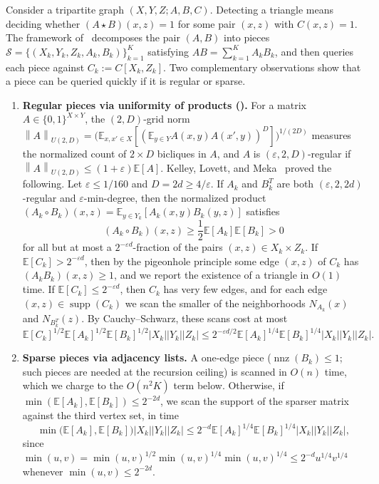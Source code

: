\documentclass[11pt]{article}
\theoremstyle{definition}
\newcommand{\E}{\mathbb{E}}
\newcommand{\supp}{\operatorname{supp}}
\newcommand{\nnz}{\operatorname{nnz}}
\newcommand{\norm}[1]{\left\lVert #1 \right\rVert}
\newcommand{\abs}[1]{\left\lvert #1 \right\rvert}
\newcommand{\dens}[1]{\E[#1]}
\begin{document}
Consider a tripartite graph $(X, Y, Z; A, B, C)$. Detecting a triangle means deciding whether $(A \star B)(x, z) = 1$ for some pair $(x, z)$ with $C(x, z) = 1$. The framework of~\cite{AFKLM24} decomposes the pair $(A, B)$ into pieces $\mathcal{S} = \{(X_k, Y_k, Z_k, A_k, B_k)\}_{k=1}^K$ satisfying $AB = \sum_{k=1}^K A_k B_k$, and then queries each piece against $C_k := C[X_k, Z_k]$. Two complementary observations show that a piece can be queried quickly if it is regular or sparse.
\begin{enumerate}[leftmargin=*]
    \item \textbf{Regular pieces via uniformity of products ().}
    For a matrix $A \in \{0, 1\}^{X \times Y}$, the $(2, D)$-grid norm $\norm{A}_{U(2, D)} = \big(\E_{x, x' \in X}[(\E_{y \in Y} A(x, y)A(x', y))^D]\big)^{1/(2D)}$ measures the normalized count of $2 \times D$ bicliques in $A$, and $A$ is $(\varepsilon, 2, D)$-regular if $\norm{A}_{U(2, D)} \le (1 + \varepsilon)\dens{A}$. Kelley, Lovett, and Meka~\cite{KelleyLM23} proved the following. Let $\varepsilon \le 1/160$ and $D = 2d \ge 4/\varepsilon$. If $A_k$ and $B_k^T$ are both $(\varepsilon, 2, 2d)$-regular and $\varepsilon$-min-degree, then the normalized product $(A_k \circ B_k)(x, z) = \E_{y \in Y_k}[A_k(x, y)B_k(y, z)]$ satisfies
    \[
        (A_k \circ B_k)(x, z) \ge \frac{1}{2}\dens{A_k}\dens{B_k} > 0
    \]
    for all but at most a $2^{-\varepsilon d}$-fraction of the pairs $(x, z) \in X_k \times Z_k$. If $\dens{C_k} > 2^{-\varepsilon d}$, then by the pigeonhole principle some edge $(x, z)$ of $C_k$ has $(A_k B_k)(x, z) \ge 1$, and we report the existence of a triangle in $O(1)$ time. If $\dens{C_k} \le 2^{-\varepsilon d}$, then $C_k$ has very few edges, and for each edge $(x, z) \in \supp(C_k)$ we scan the smaller of the neighborhoods $N_{A_k}(x)$ and $N_{B_k^T}(z)$. By Cauchy--Schwarz, these scans cost at most
    \[
        \dens{C_k}^{1/2}\dens{A_k}^{1/2}\dens{B_k}^{1/2}\abs{X_k}\abs{Y_k}\abs{Z_k} \le 2^{-\varepsilon d / 2}\dens{A_k}^{1/4}\dens{B_k}^{1/4}\abs{X_k}\abs{Y_k}\abs{Z_k}.
    \]
    \item \textbf{Sparse pieces via adjacency lists.}
    A one-edge piece ($\nnz(B_k) \le 1$; such pieces are needed at the recursion ceiling) is scanned in $O(n)$ time, which we charge to the $O(n^2 K)$ term below. Otherwise, if $\min(\dens{A_k}, \dens{B_k}) \le 2^{-2d}$, we scan the support of the sparser matrix against the third vertex set, in time
    \[
        \min\big(\dens{A_k}, \dens{B_k}\big)\abs{X_k}\abs{Y_k}\abs{Z_k} \le 2^{-d}\dens{A_k}^{1/4}\dens{B_k}^{1/4}\abs{X_k}\abs{Y_k}\abs{Z_k},
    \]
    since $\min(u, v) = \min(u, v)^{1/2}\min(u, v)^{1/4}\min(u, v)^{1/4} \le 2^{-d} u^{1/4} v^{1/4}$ whenever $\min(u, v) \le 2^{-2d}$.
\end{enumerate}
\end{document}

